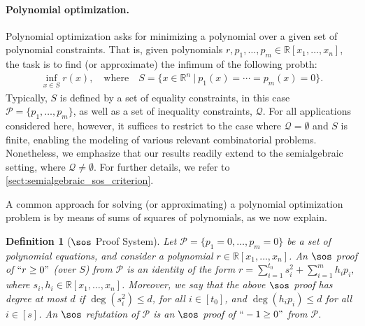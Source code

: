 \documentclass[11pt]{article}
\newtheorem{definition}[theorem]{Definition}
\begin{document}
\paragraph{Polynomial optimization.}
Polynomial optimization asks for minimizing a polynomial over a given set of polynomial constraints. That is, given polynomials $r, p_1, \ldots, p_m \in \mathbb{R}[x_1, \ldots, x_n]$, the task is to find (or approximate) the infimum of the following probth:
\begin{align}\label{eqn:POP_formulation}
    \inf_{x\in S} r(x), \quad {\text{where}} \quad S=\{x\in \mathbb{R}^n \ | \ p_1(x)=\cdots=p_m(x)=0\}.
\end{align}
%
Typically, \( S \) is defined by a set of equality constraints, in this case \( \mathcal{P} = \{p_1, \ldots, p_m\}\), as well as a set of inequality constraints, \( \mathcal{Q} \). For all applications considered here, however, it suffices to restrict to the case where \( \mathcal{Q} = \emptyset \) and \( S \) is finite, enabling the modeling of various relevant combinatorial problems. Nonetheless, we emphasize that our results readily extend to the semialgebraic setting, where \( \mathcal{Q} \neq \emptyset \). For further details, we refer to \cref{sect:semialgebraic_sos_criterion}.

A common approach for solving (or approximating) a polynomial optimization problem is by means of sums of squares of polynomials, as we now explain.
\begin{definition}[$\sos$ Proof System]\label{def:SOS_proof}
    Let $\mathcal{P} = \{p_1=0,\ldots,p_m=0\}$ be a set of polynomial equations, and consider a polynomial $r\in \mathbb{R}[x_1, \dots, x_n]$. An $\sos$ proof of $``r\geq 0"$ (over $S$) from $\mathcal{P}$ is an identity of the form $r = \sum_{i=1}^{t_0} s_i^2 + \sum_{i=1}^m h_i p_i,$
    where $s_i, h_i\in \mathbb{R}[x_1, \ldots, x_n]$. Moreover, we say that the above $\sos$ proof %
    has \emph{degree} at most $d$ if $\deg(s_i^2) \leq d$, for all $i \in [t_0]$, and $\deg(h_i p _i) \leq d$ for all $i \in [s]$. An \emph{$\sos$ refutation of $\mathcal{P}$} is an $\sos$ proof of $``-1 \geq 0"$ from $\mathcal{P}$.
\end{definition}
\end{document}
